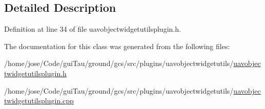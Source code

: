 \subsection{Detailed Description}


Definition at line 34 of file uavobjectwidgetutilsplugin.\-h.



The documentation for this class was generated from the following files\-:\begin{DoxyCompactItemize}
\item 
/home/jose/\-Code/gui\-Tau/ground/gcs/src/plugins/uavobjectwidgetutils/\hyperlink{uavobjectwidgetutilsplugin_8h}{uavobjectwidgetutilsplugin.\-h}\item 
/home/jose/\-Code/gui\-Tau/ground/gcs/src/plugins/uavobjectwidgetutils/\hyperlink{uavobjectwidgetutilsplugin_8cpp}{uavobjectwidgetutilsplugin.\-cpp}\end{DoxyCompactItemize}
